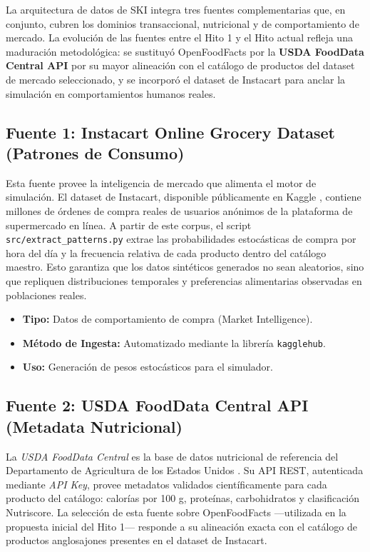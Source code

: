 \documentclass[12pt,a4paper]{article}
\newcommand{\code}[1]{\texttt{\small #1}}
\begin{document}
La arquitectura de datos de SKI integra tres fuentes complementarias que, en conjunto, cubren los dominios transaccional, nutricional y de comportamiento de mercado. La evolución de las fuentes entre el Hito 1 y el Hito actual refleja una maduración metodológica: se sustituyó OpenFoodFacts por la \textbf{USDA FoodData Central API} por su mayor alineación con el catálogo de productos del dataset de mercado seleccionado, y se incorporó el dataset de Instacart para anclar la simulación en comportamientos humanos reales.

\subsection{Fuente 1: Instacart Online Grocery Dataset (Patrones de Consumo)}

Esta fuente provee la inteligencia de mercado que alimenta el motor de simulación. El dataset de Instacart, disponible públicamente en Kaggle \cite{instacart}, contiene millones de órdenes de compra reales de usuarios anónimos de la plataforma de supermercado en línea. A partir de este corpus, el script \code{src/extract\_patterns.py} extrae las probabilidades estocásticas de compra por hora del día y la frecuencia relativa de cada producto dentro del catálogo maestro. Esto garantiza que los datos sintéticos generados no sean aleatorios, sino que repliquen distribuciones temporales y preferencias alimentarias observadas en poblaciones reales.

\begin{itemize}
    \item \textbf{Tipo:} Datos de comportamiento de compra (Market Intelligence).
    \item \textbf{Método de Ingesta:} Automatizado mediante la librería \code{kagglehub}.
    \item \textbf{Uso:} Generación de pesos estocásticos para el simulador.
\end{itemize}

\subsection{Fuente 2: USDA FoodData Central API (Metadata Nutricional)}

La \textit{USDA FoodData Central} es la base de datos nutricional de referencia del Departamento de Agricultura de los Estados Unidos \cite{usda}. Su API REST, autenticada mediante \textit{API Key}, provee metadatos validados científicamente para cada producto del catálogo: calorías por 100 g, proteínas, carbohidratos y clasificación Nutriscore. La selección de esta fuente sobre OpenFoodFacts —utilizada en la propuesta inicial del Hito 1— responde a su alineación exacta con el catálogo de productos anglosajones presentes en el dataset de Instacart.
\end{document}
